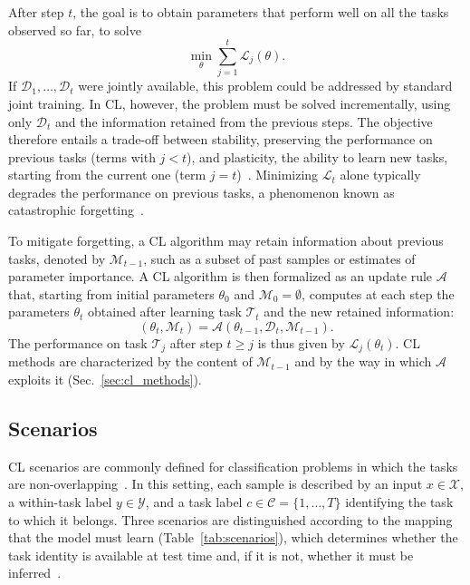 After step $t$, the goal is to obtain parameters that perform well on all the tasks observed so far, \ie to solve
\begin{equation}
    \min_{\theta} \sum_{j=1}^{t} \mathcal{L}_j(\theta).
\end{equation}
If $\mathcal{D}_1,\dots,\mathcal{D}_t$ were jointly available, this problem could be addressed by standard joint training.
In CL, however, the problem must be solved incrementally, using only $\mathcal{D}_t$ and the information retained from the previous steps.
The objective therefore entails a trade-off between stability, \ie preserving the performance on previous tasks (terms with $j<t$), and plasticity, \ie the ability to learn new tasks, starting from the current one (term $j=t$)~\cite{Wang2024tpami_cl}.
Minimizing $\mathcal{L}_t$ alone typically degrades the performance on previous tasks, a phenomenon known as catastrophic forgetting~\cite{de2021_cl}.

To mitigate forgetting, a CL algorithm may retain information about previous tasks, denoted by $\mathcal{M}_{t-1}$, such as a subset of past samples or estimates of parameter importance.
A CL algorithm is then formalized as an update rule $\mathcal{A}$ that, starting from initial parameters $\theta_0$ and $\mathcal{M}_0=\emptyset$, computes at each step the parameters $\theta_t$ obtained after learning task $\mathcal{T}_t$ and the new retained information:
\begin{equation}
    (\theta_t, \mathcal{M}_t) = \mathcal{A}\left(\theta_{t-1}, \mathcal{D}_t, \mathcal{M}_{t-1}\right).
\end{equation}
The performance on task $\mathcal{T}_j$ after step $t \ge j$ is thus given by $\mathcal{L}_j(\theta_t)$.
CL methods are characterized by the content of $\mathcal{M}_{t-1}$ and by the way in which $\mathcal{A}$ exploits it (Sec.~\ref{sec:cl_methods}).

\subsection{Scenarios}
\label{sec:cl_scenarios}

CL scenarios are commonly defined for classification problems in which the tasks are non-overlapping~\cite{van2022three}.
In this setting, each sample is described by an input $x \in \mathcal{X}$, a within-task label $y \in \mathcal{Y}$, and a task label $c \in \mathcal{C}=\{1,\dots,T\}$ identifying the task to which it belongs.
Three scenarios are distinguished according to the mapping that the model must learn (Table~\ref{tab:scenarios}), which determines whether the task identity is available at test time and, if it is not, whether it must be inferred~\cite{van2022three}.

